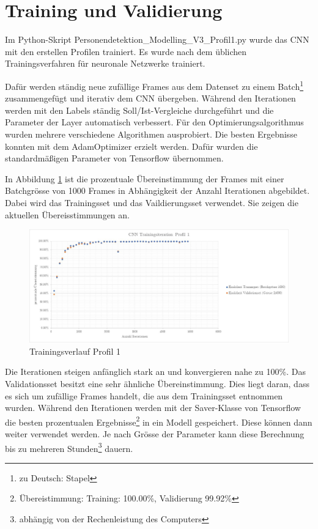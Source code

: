 \newpage
\section{Training und Validierung}
\label{TrainingValidierung}

Im Python-Skript Personendetektion\_Modelling\_V3\_Profil1.py wurde das \ac{CNN} mit den erstellen Profilen trainiert. Es wurde nach dem üblichen Trainingsverfahren für neuronale Netzwerke trainiert.

Dafür werden ständig neue zufällige Frames aus dem Datenset zu einem Batch\footnote{zu Deutsch: Stapel} zusammengefügt und iterativ dem \ac{CNN} übergeben. Während den Iterationen werden mit den Labels ständig Soll/Ist-Vergleiche durchgeführt und die Parameter der Layer automatisch verbessert. 
Für den Optimierungsalgorithmus wurden mehrere verschiedene Algorithmen ausprobiert. Die besten Ergebnisse konnten mit dem AdamOptimizer erzielt werden. Dafür wurden die standardmäßigen Parameter von Tensorflow übernommen.

In Abbildung \ref{fig:traininsverlauf} ist die prozentuale Übereinstimmung der Frames mit einer Batchgrösse von 1000 Frames in Abhängigkeit der Anzahl Iterationen abgebildet. Dabei wird das Trainingsset und das Vaildierungsset verwendet. Sie zeigen die aktuellen Übereisstimmungen an. 

\begin{figure}[H]
	\centering
	\caption[Trainingsverlauf Profil 1]{Trainingsverlauf Profil 1}
	\label{fig:traininsverlauf}
	\includegraphics[width=1.0\linewidth]{fig/Traininsverlauf}
\end{figure}

Die Iterationen steigen anfänglich stark an und konvergieren nahe zu 100\%. Das Validationsset besitzt eine sehr ähnliche Übereinstimmung. Dies liegt daran, dass es sich um zufällige Frames handelt, die aus dem Trainingsset entnommen wurden. Während den Iterationen werden mit der Saver-Klasse von Tensorflow die besten prozentualen Ergebnisse\footnote{Übereistimmung: Training: 100.00\%, Validierung 99.92\%}  in ein Modell gespeichert. Diese können dann weiter verwendet werden. Je nach Grösse der Parameter kann diese Berechnung bis zu mehreren Stunden\footnote{abhängig von der Rechenleistung des Computers} dauern. 


